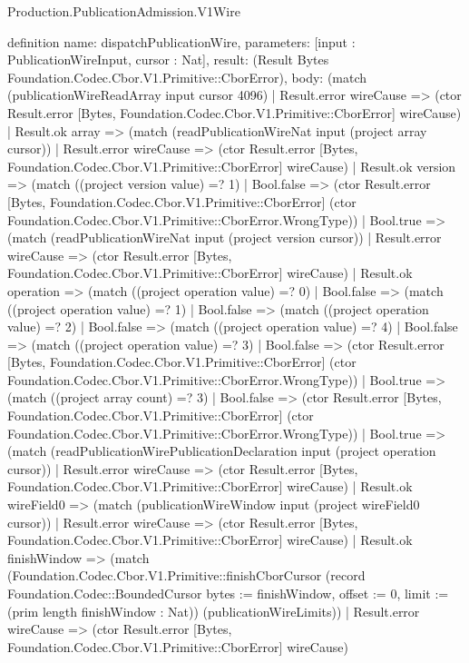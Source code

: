 \begin{lexlean}{Production.PublicationAdmission.V1Wire}
\begin{semanticmodule}
definition{
  name: dispatchPublicationWire,
  parameters: [input : PublicationWireInput, cursor : Nat],
  result: (Result Bytes Foundation.Codec.Cbor.V1.Primitive::CborError),
  body: (match (publicationWireReadArray input cursor 4096)
    | Result.error wireCause => (ctor Result.error [Bytes, Foundation.Codec.Cbor.V1.Primitive::CborError] wireCause)
    | Result.ok array => (match (readPublicationWireNat input (project array cursor))
      | Result.error wireCause => (ctor Result.error [Bytes, Foundation.Codec.Cbor.V1.Primitive::CborError] wireCause)
      | Result.ok version => (match ((project version value) =? 1)
        | Bool.false => (ctor Result.error [Bytes, Foundation.Codec.Cbor.V1.Primitive::CborError] (ctor Foundation.Codec.Cbor.V1.Primitive::CborError.WrongType))
        | Bool.true => (match (readPublicationWireNat input (project version cursor))
          | Result.error wireCause => (ctor Result.error [Bytes, Foundation.Codec.Cbor.V1.Primitive::CborError] wireCause)
          | Result.ok operation => (match ((project operation value) =? 0)
            | Bool.false => (match ((project operation value) =? 1)
              | Bool.false => (match ((project operation value) =? 2)
                | Bool.false => (match ((project operation value) =? 4)
                  | Bool.false => (match ((project operation value) =? 3)
                    | Bool.false => (ctor Result.error [Bytes, Foundation.Codec.Cbor.V1.Primitive::CborError] (ctor Foundation.Codec.Cbor.V1.Primitive::CborError.WrongType))
                    | Bool.true => (match ((project array count) =? 3)
                      | Bool.false => (ctor Result.error [Bytes, Foundation.Codec.Cbor.V1.Primitive::CborError] (ctor Foundation.Codec.Cbor.V1.Primitive::CborError.WrongType))
                      | Bool.true => (match (readPublicationWirePublicationDeclaration input (project operation cursor))
                        | Result.error wireCause => (ctor Result.error [Bytes, Foundation.Codec.Cbor.V1.Primitive::CborError] wireCause)
                        | Result.ok wireField0 => (match (publicationWireWindow input (project wireField0 cursor))
                          | Result.error wireCause => (ctor Result.error [Bytes, Foundation.Codec.Cbor.V1.Primitive::CborError] wireCause)
                          | Result.ok finishWindow => (match (Foundation.Codec.Cbor.V1.Primitive::finishCborCursor (record Foundation.Codec::BoundedCursor {bytes := finishWindow, offset := 0, limit := (prim length finishWindow : Nat)}) (publicationWireLimits))
                            | Result.error wireCause => (ctor Result.error [Bytes, Foundation.Codec.Cbor.V1.Primitive::CborError] wireCause)
}
\end{semanticmodule}
\end{lexlean}
